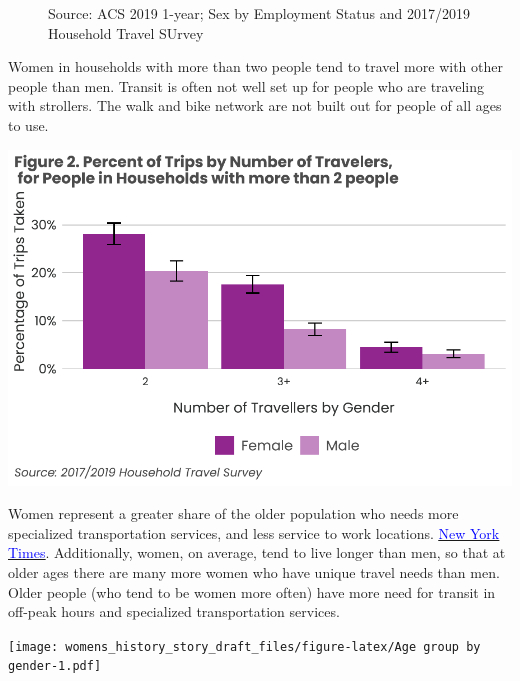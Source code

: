 \documentclass[
  12pt,
]{article}
\begin{document}
\begin{figure}
\caption{Source: ACS 2019 1-year; Sex by Employment Status and 2017/2019 Household Travel SUrvey}\label{fig:matrix}
\end{figure}
\begin{flushleft}
Women in households with more than two people tend to travel more with other people than men. Transit is often not well set up for people who are traveling with strollers. The walk and bike network are not built out for people of all ages to use.
\end{flushleft}

\includegraphics{womens_history_story_draft_files/figure-latex/Trips by Number of Travellers-1.pdf}

\begin{flushleft}
Women represent a greater share of the older population who needs more specialized transportation services, and less service to work locations. \href{https://www.nytimes.com/2022/12/03/health/elderly-living-alone.html}{\underline{\textcolor{blue}{New York Times}}}. Additionally, women, on average, tend to live longer than men, so that at older ages there are many more women who have unique travel needs than men. Older people (who tend to be women more often) have more need for transit in off-peak hours and specialized transportation services. 
\end{flushleft}

\texttt{[image: womens\_history\_story\_draft\_files/figure-latex/Age group by gender-1.pdf]}
\end{document}
